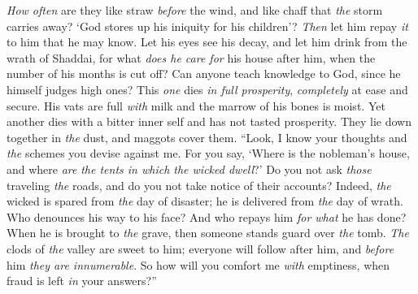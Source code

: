 \begin{biblechapter}
\verse \textit{How often} are they like straw \textit{before} the wind, 
and like chaff that \textit{the} storm carries away?
\verse ‘God stores up his iniquity for his children’? 
\textit{Then} let him repay \textit{it} to him that he may know.
\verse Let his eyes see his decay, 
and let him drink from the wrath of Shaddai,
\verse for what \textit{does he care for} his house after him, 
when the number of his months is cut off?
\verse Can anyone teach knowledge to God, 
since he himself judges high ones?
\verse This \textit{one} dies \textit{in full prosperity}, 
\textit{completely} at ease and secure.
\verse His vats are full \textit{with} milk 
and the marrow of his bones is moist.
\verse Yet another dies with a bitter inner self 
and has not tasted prosperity.
\verse They lie down together in \textit{the} dust, 
and maggots cover them.
\verse “Look, I know your thoughts 
and \textit{the} schemes you devise against me.
\verse For you say, ‘Where is the nobleman’s house, 
and where \textit{are} \textit{the tents in which the wicked dwell}?’
\verse Do you not ask \textit{those} traveling \textit{the} roads, 
and do you not take notice of their accounts?
\verse Indeed, \textit{the} wicked is spared from \textit{the} day of disaster; 
he is delivered from \textit{the} day of wrath.
\verse Who denounces his way to his face? 
And who repays him \textit{for what} he has done?
\verse When he is brought to \textit{the} grave, 
then someone stands guard over \textit{the} tomb.
\verse \textit{The} clods of \textit{the} valley are sweet to him; 
everyone will follow after him, 
and \textit{before} him \textit{they are innumerable}.
\verse So how will you comfort me \textit{with} emptiness, 
when fraud is left \textit{in} your answers?”
\end{biblechapter}

